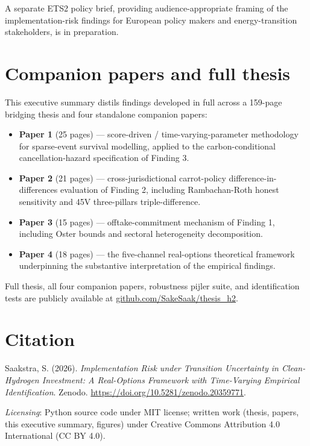\documentclass[11pt,a4paper]{article}
\begin{document}
A separate ETS2 policy brief, providing audience-appropriate framing of the implementation-risk findings for European policy makers and energy-transition stakeholders, is in preparation.

\section*{Companion papers and full thesis}

This executive summary distils findings developed in full across a 159-page bridging thesis and four standalone companion papers:

\begin{itemize}
\item \textbf{Paper 1} (25 pages) --- score-driven / time-varying-parameter methodology for sparse-event survival modelling, applied to the carbon-conditional cancellation-hazard specification of Finding 3.
\item \textbf{Paper 2} (21 pages) --- cross-jurisdictional carrot-policy difference-in-differences evaluation of Finding 2, including Rambachan-Roth honest sensitivity and 45V three-pillars triple-difference.
\item \textbf{Paper 3} (15 pages) --- offtake-commitment mechanism of Finding 1, including Oster bounds and sectoral heterogeneity decomposition.
\item \textbf{Paper 4} (18 pages) --- the five-channel real-options theoretical framework underpinning the substantive interpretation of the empirical findings.
\end{itemize}

Full thesis, all four companion papers, robustness pijler suite, and identification tests are publicly available at \href{https://github.com/SakeSaak/thesis_h2}{github.com/SakeSaak/thesis\_h2}.

\section*{Citation}

\noindent Saakstra, S. (2026). \emph{Implementation Risk under Transition Uncertainty in Clean-Hydrogen Investment: A Real-Options Framework with Time-Varying Empirical Identification}. Zenodo. \href{https://doi.org/10.5281/zenodo.20359771}{https://doi.org/10.5281/zenodo.20359771}.

\vspace{0.5em}
\noindent\textit{Licensing}: Python source code under MIT license; written work (thesis, papers, this executive summary, figures) under Creative Commons Attribution 4.0 International (CC BY 4.0).
\end{document}
